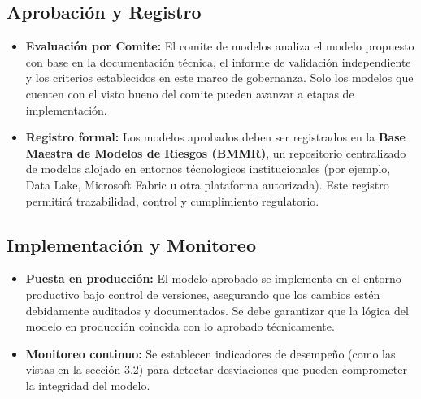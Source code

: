 \documentclass[11pt,oneside]{article}%
\begin{document}
\subsection{Aprobación y Registro}
\begin{itemize}
\item \textbf{Evaluación por Comite:} El comite de modelos analiza el modelo propuesto con base en la documentación técnica, el informe de validación independiente y los criterios establecidos en este marco de gobernanza. Solo los modelos que cuenten con el visto bueno del comite pueden avanzar a etapas de implementación. 
\item \textbf{Registro formal:} Los modelos aprobados deben ser registrados en la \textbf{Base Maestra de Modelos de Riesgos (BMMR)}, un repositorio centralizado de modelos alojado en entornos técnologicos institucionales (por ejemplo, Data Lake, Microsoft Fabric u otra plataforma autorizada). Este registro permitirá trazabilidad, control y cumplimiento regulatorio. 
\end{itemize}
\subsection{Implementación y Monitoreo}
\begin{itemize}
\item \textbf{Puesta en producción:} El modelo aprobado se implementa en el entorno productivo bajo control de versiones, asegurando que los cambios estén debidamente auditados y documentados. Se debe garantizar que la lógica del modelo en producción coincida con lo aprobado técnicamente. 
\item \textbf{Monitoreo continuo:} Se establecen indicadores de desempeño (como las vistas en la sección 3.2) para detectar desviaciones que pueden comprometer la integridad del modelo. 
\end{itemize}
\end{document}
